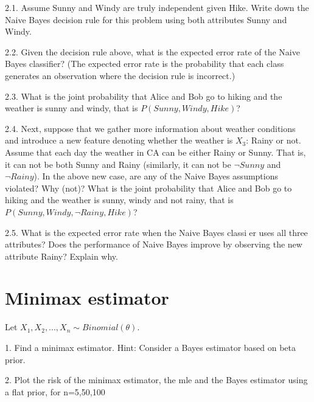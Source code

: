 \documentclass{article}
\theoremstyle{definition}
\theoremstyle{definition}
\theoremstyle{remark}
\begin{document}
2.1. Assume Sunny and Windy are truly independent given Hike. Write down the Naive Bayes
decision rule for this problem using both attributes Sunny and Windy.

2.2. Given the decision rule above, what is the expected error rate of the Naive Bayes classifier? (The
expected error rate is the probability that each class generates an observation where the decision
rule is incorrect.)

2.3. What is the joint probability that Alice and Bob go to hiking and the weather is sunny and
windy, that is $P(Sunny,Windy,Hike)$?

2.4. Next, suppose that we gather more information about weather conditions and introduce a new feature
denoting whether the weather is $X_3$: Rainy or not. Assume that each day the weather in CA can
be either Rainy or Sunny. That is, it can not be both Sunny and Rainy (similarly, it can not be
$\neg Sunny$ and $\neg Rainy$). In the above new case, are any of the Naive Bayes assumptions violated? Why (not)? What is
the joint probability that Alice and Bob go to hiking and the weather is sunny, windy and not
rainy, that is $P(Sunny,Windy,\neg Rainy,Hike)$?

2.5. What is the expected error rate when the Naive Bayes classier uses all three attributes? Does
the performance of Naive Bayes improve by observing the new attribute Rainy? Explain why.



\section*{Minimax estimator}
Let $X_1,X_2,...,X_n\sim Binomial(\theta).$

1. Find a minimax estimator. Hint: Consider a Bayes estimator based on beta prior.

2. Plot the risk of the minimax estimator, the mle and the Bayes estimator using a flat prior, for n=5,50,100
\end{document}

